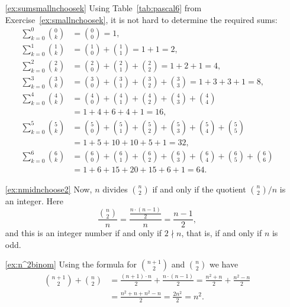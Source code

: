 \begin{enumerate}
\item[\ref{ex:sumsmallnchoosek}]
Using Table~\ref{tab:pascal6} from Exercise~\ref{ex:smallnchoosek}, 
it is not hard to determine the required sums:
\begin{align*}
\sum_{k=0}^0 \binom{0}{k} &= \binom{0}{0} = 1, \\
\sum_{k=0}^1 \binom{1}{k} &= \binom{1}{0} + \binom{1}{1} = 1 + 1 = 2, \\
\sum_{k=0}^2 \binom{2}{k} &= \binom{2}{0} + \binom{2}{1} + \binom{2}{2} = 1 + 2 + 1 = 4, \\
\sum_{k=0}^3 \binom{3}{k} &= \binom{3}{0} + \binom{3}{1} + \binom{3}{2} + \binom{3}{3} = 1 + 3 + 3 + 1 = 8, \\ 
\sum_{k=0}^4 \binom{4}{k} &= \binom{4}{0} + \binom{4}{1} + \binom{4}{2} + \binom{4}{3} + \binom{4}{4} \\
&= 1 + 4 + 6 + 4 + 1 = 16, \\ 
\sum_{k=0}^5 \binom{5}{k} &= \binom{5}{0} + \binom{5}{1} + \binom{5}{2} + \binom{5}{3} + \binom{5}{4} + \binom{5}{5} \\
&= 1 + 5 + 10 + 10 + 5 + 1 = 32, \\
\sum_{k=0}^6 \binom{6}{k} &= \binom{6}{0} + \binom{6}{1} + \binom{6}{2} + \binom{6}{3} + \binom{6}{4} + \binom{6}{5} + \binom{6}{6} \\
&= 1 + 6 + 15 + 20 + 15 + 6 + 1 = 64. 
\end{align*}



\item[\ref{ex:nmidnchoose2}]
Now, $n$ divides $\binom{n}{2}$ if and only if the quotient $\binom{n}{2} / n$ is an integer. 
Here
\[
\frac{\binom{n}{2}}{n} = \frac{\frac{n\cdot (n-1)}{2}}{n} = \frac{n-1}{2}, 
\]
and this is an integer number if and only if $2 \nmid n$, that is, if and only if $n$ is odd. 

\item[\ref{ex:n^2binom}]
Using the formula for $\binom{n+1}{2}$ and $\binom{n}{2}$ we have 
\begin{align*}
\binom{n+1}{2} + \binom{n}{2} &= \frac{(n+1) \cdot n}{2} + \frac{n \cdot (n-1)}{2} = \frac{n^2+n}{2} + \frac{n^2-n}{2} \\
&= \frac{n^2 + n + n^2 -n }{2} = \frac{2n^2}{2} = n^2. 
\end{align*}










\end{enumerate}
